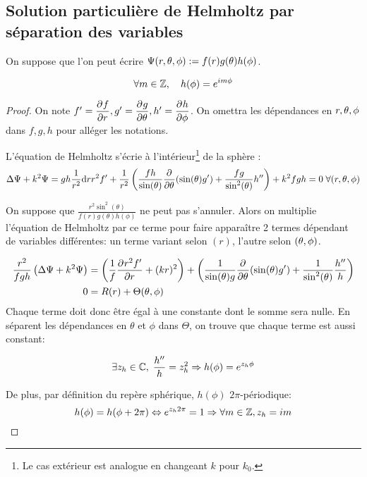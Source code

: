 \subsection{Solution particulière de Helmholtz par séparation des variables}
\begin{hyp}
On suppose que l'on peut écrire $\Psi(\rtp) : = f(r)g(\theta)h(\phi)$. 
\end{hyp}
\begin{prop}
\begin{equation}
\forall m \in \ZZ, \quad h(\phi) = e^{im\phi}
\end{equation}
\end{prop}
\begin{proof}
On note $f' =\ddr{r}{f}, g' = \ddr{\theta}{g} , h' = \ddr{\phi}{h}$. On omettra les dépendances en $\rtp$ dans $f,g,h$ pour alléger les notations.

L'équation de Helmholtz s'écrie à l'intérieur\footnote{Le cas extérieur est analogue en changeant $k$ pour $k_0$.} de la sphère : 
\begin{equation}\label{eq:helm:helm}
  \Delta \Psi + k^2 \Psi = gh\frac{1}{r^2}\dd{r}{r^2f'} + \frac{1}{r^2}\left(\frac{fh}{\sin(\theta)}\ddr{\theta}{}(\sin(\theta)g')+\frac{fg}{\sin^2(\theta)}h''\right) + k^2 fgh = 0 \; \forall (r,\tp)
\end{equation}

On suppose que $ \frac{r^2\sin^2(\theta)}{f(r)g(\theta)h(\phi)}$ ne peut pas s'annuler. Alors on multiplie l'équation de Helmholtz par ce terme pour faire apparaître 2 termes dépendant de variables différentes: un terme variant selon $(r)$, l'autre selon $(\tp)$. 

\begin{align*}
\frac{r^2}{fgh} \left(\Delta \Psi + k^2 \Psi\right) &= 
\left(\frac{1}{f}\ddr{r}{r^2f'} + (kr)^2\right) + 
\left(\frac{1}{ \sin(\theta)g} \ddr{\theta}{}(\sin(\theta)g') +  \frac{1}{ \sin^2(\theta)}\frac{h''}{h} \right)\\
0 &=R(r) + \Theta(\tp)
\end{align*}
Chaque terme doit donc être égal à une constante dont le somme sera nulle. En séparent les dépendances en $\theta$ et $\phi$ dans $\Theta$, on trouve que chaque terme est aussi constant:

\[ 
\exists z_h \in \CC,\; \frac{h''}{h} = z_h^2 \Rightarrow h(\phi) = e^{z_h\phi}
\]

De plus, par définition du repère sphérique, $h(\phi)$ $2\pi$-périodique:
\[
h(\phi) = h(\phi + 2\pi) \Leftrightarrow e^{z_h2\pi}= 1 \Rightarrow \forall m \in \ZZ, z_h = im
\]
\end{proof}

